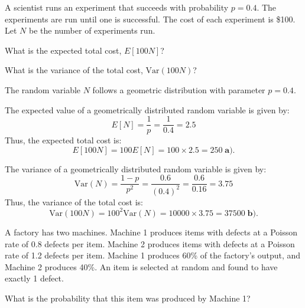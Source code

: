 \documentclass[a4paper, 10pt]{article}
\begin{document}
\pagebreak

\begin{problem}
A scientist runs an experiment that succeeds with probability \( p = 0.4 \).
The experiments are run until one is successful. The cost of each experiment is \$100.
Let \( N \) be the number of experiments run.
\begin{subproblems}
    \item What is the expected total cost, \( E[100N] \)?
    \item What is the variance of the total cost, \( \text{Var}(100N) \)?
\end{subproblems}
\end{problem}

\begin{solution}
The random variable \( N \) follows a geometric distribution with parameter \( p = 0.4 \).

The expected value of a geometrically distributed random variable is given by:
\[
    E[N] = \frac{1}{p} = \frac{1}{0.4} = 2.5
\]
Thus, the expected total cost is:
\[
    E[100N] = 100E[N] = 100 \times 2.5 = \boxed{250} \; \textbf{a).}
\]

The variance of a geometrically distributed random variable is given by:
\[
    \text{Var}(N) = \frac{1-p}{p^2} = \frac{0.6}{(0.4)^2} = \frac{0.6}{0.16} = 3.75
\]
Thus, the variance of the total cost is:
\[
    \text{Var}(100N) = 100^2 \text{Var}(N) = 10000 \times 3.75 = \boxed{37500} \; \textbf{b).}
\]
\end{solution}


\begin{problem}
A factory has two machines. Machine 1 produces items with defects at a Poisson rate of 0.8 defects per item.
Machine 2 produces items with defects at a Poisson rate of 1.2 defects per item.
Machine 1 produces 60\% of the factory's output, and Machine 2 produces 40\%.
An item is selected at random and found to have exactly 1 defect.
\begin{subproblems}
    \item What is the probability that this item was produced by Machine 1?
\end{subproblems}
\end{problem}
\end{document}
